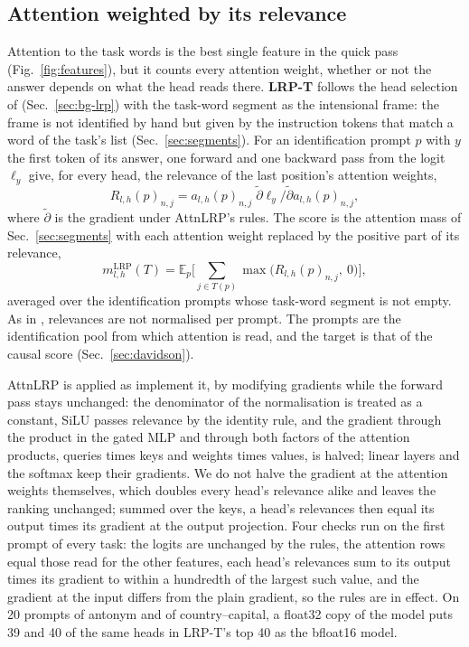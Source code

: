 \documentclass[10pt,a4paper]{article}
\begin{document}
\subsection{Attention weighted by its relevance}\label{sec:lrp}

Attention to the task words is the best single feature in the quick pass (Fig.~\ref{fig:features}), but it counts every attention weight, whether or not the answer depends on what the head reads there. \textbf{LRP-T} follows the head selection of \citet{pham2026fast} (Sec.~\ref{sec:bg-lrp}) with the task-word segment as the intensional frame: the frame is not identified by hand but given by the instruction tokens that match a word of the task's list (Sec.~\ref{sec:segments}). For an identification prompt $p$ with $y$ the first token of its answer, one forward and one backward pass from the logit $\ell_y$ give, for every head, the relevance of the last position's attention weights,
\begin{equation}
R_{l,h}(p)_{n,j} = a_{l,h}(p)_{n,j}\; \tilde\partial \ell_y / \tilde\partial a_{l,h}(p)_{n,j},
\end{equation}
where $\tilde\partial$ is the gradient under AttnLRP's rules. The score is the attention mass of Sec.~\ref{sec:segments} with each attention weight replaced by the positive part of its relevance,
\begin{equation}
m^{\mathrm{LRP}}_{l,h}(T) = \mathbb{E}_{p}\Big[\sum_{j\in T(p)} \max\big(R_{l,h}(p)_{n,j},\ 0\big)\Big],
\end{equation}
averaged over the identification prompts whose task-word segment is not empty. As in \citet{pham2026fast}, relevances are not normalised per prompt. The prompts are the identification pool from which attention is read, and the target is that of the causal score (Sec.~\ref{sec:davidson}).

AttnLRP is applied as \citet[App.~A]{pham2026fast} implement it, by modifying gradients while the forward pass stays unchanged: the denominator of the normalisation is treated as a constant, SiLU passes relevance by the identity rule, and the gradient through the product in the gated MLP and through both factors of the attention products, queries times keys and weights times values, is halved; linear layers and the softmax keep their gradients. We do not halve the gradient at the attention weights themselves, which doubles every head's relevance alike and leaves the ranking unchanged; summed over the keys, a head's relevances then equal its output times its gradient at the output projection. Four checks run on the first prompt of every task: the logits are unchanged by the rules, the attention rows equal those read for the other features, each head's relevances sum to its output times its gradient to within a hundredth of the largest such value, and the gradient at the input differs from the plain gradient, so the rules are in effect. On 20 prompts of antonym and of country--capital, a float32 copy of the model puts 39 and 40 of the same heads in LRP-T's top 40 as the bfloat16 model.
\end{document}
